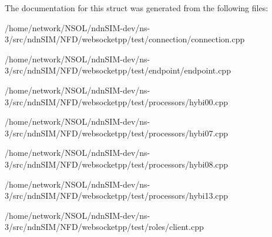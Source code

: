 The documentation for this struct was generated from the following files\+:\begin{DoxyCompactItemize}
\item 
/home/network/\+N\+S\+O\+L/ndn\+S\+I\+M-\/dev/ns-\/3/src/ndn\+S\+I\+M/\+N\+F\+D/websocketpp/test/connection/connection.\+cpp\item 
/home/network/\+N\+S\+O\+L/ndn\+S\+I\+M-\/dev/ns-\/3/src/ndn\+S\+I\+M/\+N\+F\+D/websocketpp/test/endpoint/endpoint.\+cpp\item 
/home/network/\+N\+S\+O\+L/ndn\+S\+I\+M-\/dev/ns-\/3/src/ndn\+S\+I\+M/\+N\+F\+D/websocketpp/test/processors/hybi00.\+cpp\item 
/home/network/\+N\+S\+O\+L/ndn\+S\+I\+M-\/dev/ns-\/3/src/ndn\+S\+I\+M/\+N\+F\+D/websocketpp/test/processors/hybi07.\+cpp\item 
/home/network/\+N\+S\+O\+L/ndn\+S\+I\+M-\/dev/ns-\/3/src/ndn\+S\+I\+M/\+N\+F\+D/websocketpp/test/processors/hybi08.\+cpp\item 
/home/network/\+N\+S\+O\+L/ndn\+S\+I\+M-\/dev/ns-\/3/src/ndn\+S\+I\+M/\+N\+F\+D/websocketpp/test/processors/hybi13.\+cpp\item 
/home/network/\+N\+S\+O\+L/ndn\+S\+I\+M-\/dev/ns-\/3/src/ndn\+S\+I\+M/\+N\+F\+D/websocketpp/test/roles/client.\+cpp\end{DoxyCompactItemize}
